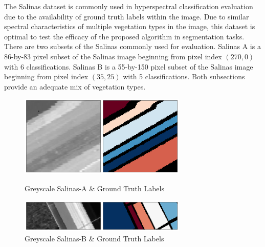 The Salinas dataset is commonly used in hyperspectral classification evaluation due to the availability of ground truth labels within the image. Due to similar spectral characteristics of multiple vegetation types in the image, this dataset is optimal to test the efficacy of the proposed algorithm in segmentation tasks. There are two subsets of the Salinas commonly used for evaluation. Salinas A is a 86-by-83 pixel subset of the Salinas image beginning from pixel index $(270, 0)$ with 6 classifications. Salinas B is a 55-by-150 pixel subset of the Salinas image beginning from pixel index $(35, 25)$ with 5 classifications. Both subsections provide an adequate mix of vegetation types.
\begin{figure}[H]
    \centering
    \includegraphics[width=8cm]{salinas-a.png}  %
    \caption{Greyscale Salinas-A \& Ground Truth Labels}
    \includegraphics[width=8cm]{salinas-b.png}  %
    \caption{Greyscale Salinas-B \& Ground Truth Labels}
    \label{salinas-ab}  %
  \end{figure}

